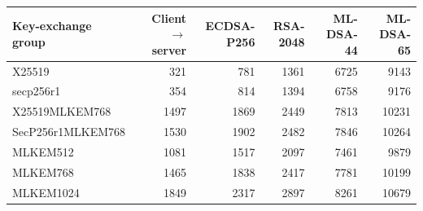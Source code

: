 \begin{tabular}{lrrrrr}
\toprule
Key-exchange group & Client$\to$server & ECDSA-P256 & RSA-2048 & ML-DSA-44 & ML-DSA-65 \\
\midrule
X25519 & 321 & 781 & 1361 & 6725 & 9143 \\
secp256r1 & 354 & 814 & 1394 & 6758 & 9176 \\
X25519MLKEM768 & 1497 & 1869 & 2449 & 7813 & 10231 \\
SecP256r1MLKEM768 & 1530 & 1902 & 2482 & 7846 & 10264 \\
MLKEM512 & 1081 & 1517 & 2097 & 7461 & 9879 \\
MLKEM768 & 1465 & 1838 & 2417 & 7781 & 10199 \\
MLKEM1024 & 1849 & 2317 & 2897 & 8261 & 10679 \\
\bottomrule
\end{tabular}
